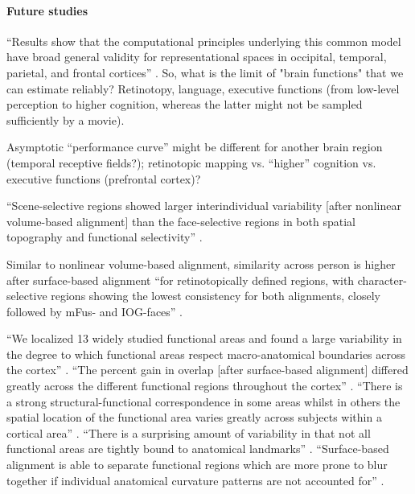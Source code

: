 \paragraph{Future studies}





``Results show that the computational principles underlying this common model
have broad general validity for representational spaces in occipital, temporal,
parietal, and frontal cortices'' \citep{guntupalli2016model}.
%
So, what is the limit of "brain functions" that we can estimate reliably?
%
Retinotopy, language, executive functions (from low-level perception to higher
cognition, whereas the latter might not be sampled sufficiently by a movie).

%
Asymptotic ``performance curve'' might be different for another brain region
(temporal receptive fields?); retinotopic mapping vs. ``higher'' cognition  vs.
executive functions (prefrontal cortex)?

``Scene-selective regions showed larger interindividual variability [after
nonlinear volume-based alignment] than the face-selective regions in both
spatial topography and functional selectivity'' \citet{zhen2017quantifying}.


Similar to nonlinear volume-based alignment, similarity across person is higher
after surface-based alignment ``for retinotopically defined regions, with
character-selective regions showing the lowest consistency for both alignments,
closely followed by mFus- and IOG-faces'' \citep{rosenke2021probabilistic}.

%
``We localized 13 widely studied functional areas and found a large variability
in the degree to which functional areas respect macro-anatomical boundaries
across the cortex'' \citep{frost2012measuring}.
%
``The percent gain in overlap [after surface-based alignment] differed greatly
across the different functional regions throughout the cortex''
\citep{frost2012measuring}.
%
``There is a strong structural-functional correspondence in some areas whilst in
others the spatial location of the functional area varies greatly across
subjects within a cortical area'' \citep{frost2012measuring}.
%
``There is a surprising amount of variability in that not all functional areas
are tightly bound to anatomical landmarks'' \citep{frost2012measuring}.
%
``Surface-based alignment is able to separate functional regions which are more
prone to blur together if individual anatomical curvature patterns are not
accounted for'' \citep{frost2012measuring}.

